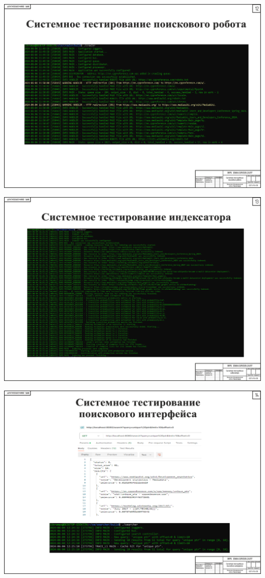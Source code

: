 \begin{landscape}
\begin{плакат}
    \includegraphics[width=0.82\linewidth]{posters/ptr.eps}
    \label{ptr:image}      
\end{плакат}

\begin{плакат}
    \includegraphics[width=0.82\linewidth]{posters/pti.eps}
    \label{pti:image}      
\end{плакат}

\begin{плакат}
    \includegraphics[width=0.82\linewidth]{posters/pts.eps}
    \label{pts:image}      
\end{плакат}


\end{landscape}
